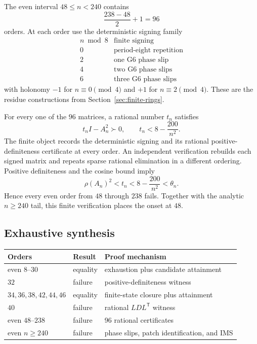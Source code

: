 The even interval \(48\leq n<240\) contains
\[
\frac{238-48}{2}+1=96
\]
orders.  At each order use the deterministic signing family
\[
\begin{array}{c|l}
n\bmod8&\text{finite signing}\\ \hline
0&\text{period-eight repetition}\\
2&\text{one G6 phase slip}\\
4&\text{two G6 phase slips}\\
6&\text{three G6 phase slips}
\end{array}
\]
with holonomy \(-1\) for \(n\equiv0\pmod4\) and \(+1\) for
\(n\equiv2\pmod4\). These are the residue constructions from
Section~\ref{sec:finite-rings}.

For every one of the \(96\) matrices, a rational number \(t_n\) satisfies
\[
t_nI-A_n^2\succ0,\qquad
t_n<8-\frac{200}{n^2}.
\]
The finite object records the deterministic signing and its rational
positive-definiteness certificate at every order. An independent
verification rebuilds each signed matrix and repeats sparse
rational elimination in a different ordering.  Positive definiteness and
the cosine bound imply
\[
\rho(A_n)^2<t_n<8-\frac{200}{n^2}<\theta_n.
\]
Hence every even order from \(48\) through \(238\) fails. Together with the
analytic \(n\geq240\) tail, this finite verification places the onset at
\(48\).

\subsection{Exhaustive synthesis}
\label{subsec:exhaustive-synthesis}

\begin{center}
\begin{tabularx}{\textwidth}{@{}l l X@{}}
\toprule
Orders&Result&Proof mechanism\\
\midrule
even \(8\)--\(30\)&equality&exhaustion plus candidate attainment\\
\(32\)&failure&positive-definiteness witness\\
\(34,36,38,42,44,46\)&equality&finite-state closure plus attainment\\
\(40\)&failure&rational \(LDL^{\mathsf T}\) witness\\
even \(48\)--\(238\)&failure&96 rational certificates\\
even \(n\geq240\)&failure&phase slips, patch identification, and IMS\\
\bottomrule
\end{tabularx}
\end{center}

